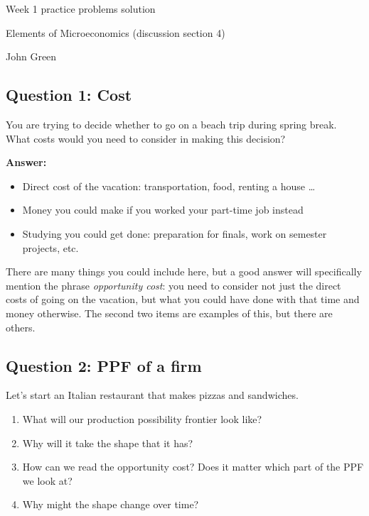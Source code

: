 \documentclass[12pt]{article}
\begin{document}
\begin{center}
\Large Week 1 practice problems solution

\medskip

\normalsize Elements of Microeconomics (discussion section 4)

\medskip

\small John Green
\end{center}

\medskip

\subsection*{Question 1: Cost}
You are trying to decide whether to go on a beach trip during spring break. What costs would you need to consider in making this decision?

\medskip

\textbf{Answer:}

\begin{itemize}
    \item Direct cost of the vacation: transportation, food, renting a house \dots
    \item Money you could make if you worked your part-time job instead
    \item Studying you could get done: preparation for finals, work on semester projects, etc.
\end{itemize}

There are many things you could include here, but a good answer will specifically mention the phrase \textit{opportunity cost}: you need to consider not just the direct costs of going on the vacation, but what you could have done with that time and money otherwise. The second two items are examples of this, but there are others.

\subsection*{Question 2: PPF of a firm}
Let's start an Italian restaurant that makes pizzas and sandwiches.
\begin{enumerate}
    \item What will our production possibility frontier look like?
    \item Why will it take the shape that it has?
    \item How can we read the opportunity cost? Does it matter which part of the PPF we look at?
    \item Why might the shape change over time?
\end{enumerate}
\end{document}
